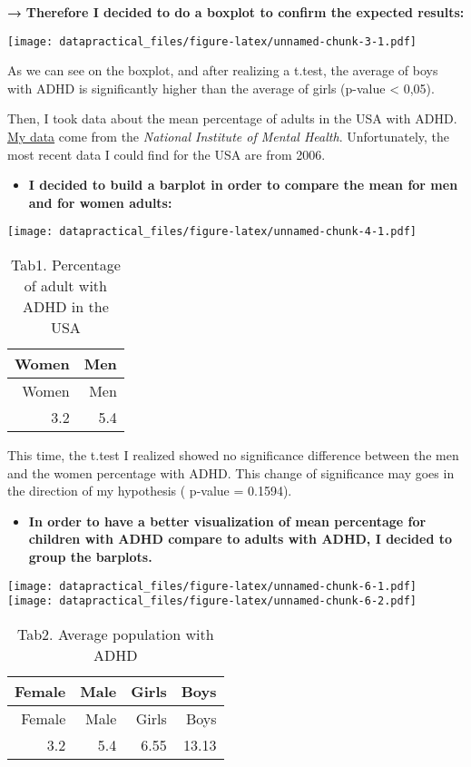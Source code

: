 \documentclass[
]{article}
\providecommand{\tightlist}{%
  \setlength{\itemsep}{0pt}\setlength{\parskip}{0pt}}
\begin{document}
\textbf{→} \textbf{Therefore I decided to do a boxplot to confirm the
expected results:}

\texttt{[image: datapractical\_files/figure-latex/unnamed-chunk-3-1.pdf]}

As we can see on the boxplot, and after realizing a t.test, the average
of boys with ADHD is significantly higher than the average of girls
(p-value \textless{} 0,05).

Then, I took data about the mean percentage of adults in the USA with
ADHD.
\href{https://www.nimh.nih.gov/health/statistics/attention-deficit-hyperactivity-disorder-adhd\#part_2553}{My
data} come from the \emph{National Institute of Mental Health}.
Unfortunately, the most recent data I could find for the USA are from
2006.

\begin{itemize}
\tightlist
\item
  \textbf{I decided to build a barplot in order to compare the mean for
  men and for women adults:}
\end{itemize}

\texttt{[image: datapractical\_files/figure-latex/unnamed-chunk-4-1.pdf]}

\begin{longtable}[]{@{}rr@{}}
\caption{Tab1. Percentage of adult with ADHD in the USA}\tabularnewline
\toprule()
Women & Men \\
\midrule()
\endfirsthead
\toprule()
Women & Men \\
\midrule()
\endhead
3.2 & 5.4 \\
\bottomrule()
\end{longtable}

This time, the t.test I realized showed no significance difference
between the men and the women percentage with ADHD. This change of
significance may goes in the direction of my hypothesis ( p-value =
0.1594).

\begin{itemize}
\tightlist
\item
  \textbf{In order to have a better visualization of mean percentage for
  children with ADHD compare to adults with ADHD, I decided to group the
  barplots.}
\end{itemize}

\texttt{[image: datapractical\_files/figure-latex/unnamed-chunk-6-1.pdf]}
\texttt{[image: datapractical\_files/figure-latex/unnamed-chunk-6-2.pdf]}

\begin{longtable}[]{@{}rrrr@{}}
\caption{Tab2. Average population with ADHD}\tabularnewline
\toprule()
Female & Male & Girls & Boys \\
\midrule()
\endfirsthead
\toprule()
Female & Male & Girls & Boys \\
\midrule()
\endhead
3.2 & 5.4 & 6.55 & 13.13 \\
\bottomrule()
\end{longtable}
\end{document}

